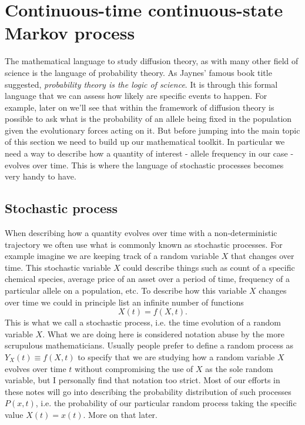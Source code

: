 \section{Continuous-time continuous-state Markov process}

The mathematical language to study diffusion theory, as with many other field of
science is the language of probability theory. As Jaynes' famous book title
suggested, \textit{probability theory is the logic of science}. It is through
this formal language that we can assess how likely are specific events to
happen. For example, later on we'll see that within the framework of diffusion
theory is possible to ask what is the probability of an allele being fixed in
the population given the evolutionary forces acting on it. But before jumping
into the main topic of this section we need to build up our mathematical
toolkit. In particular we need a way to describe how a quantity of interest -
allele frequency in our case - evolves over time. This is where the language of
stochastic processes becomes very handy to have.

\subsection{Stochastic process}

When describing how a quantity evolves over time with a non-deterministic
trajectory we often use what is commonly known as stochastic processes. For
example imagine we are keeping track of a random variable $X$ that changes over
time. This stochastic variable $X$ could describe things such as count of a
specific chemical species, average price of an asset over a period of time,
frequency of a particular allele on a population, etc. To describe how this
variable $X$ changes over time we could in principle list an infinite number of
functions
\begin{equation}
  X(t) = f(X, t).
\end{equation}
This is what we call a stochastic process, i.e. the time evolution of a random
variable $X$. What we are doing here is considered notation abuse by the more
scrupulous mathematicians. Usually people prefer to define a random process as
$Y_X(t) \equiv f(X, t)$ to specify that we are studying how a random variable
$X$ evolves over time $t$ without compromising the use of $X$ as the sole random
variable, but I personally find that notation too strict. Most of our efforts in
these notes will go into describing the probability distribution of such
processes $P(x, t)$, i.e. the probability of our particular random process
taking the specific value $X(t) = x(t)$. More on that later.

